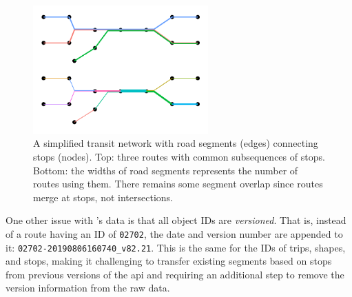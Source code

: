 \begin{knitrout}\small
{}\color{fgcolor}\begin{figure}

{\centering \includegraphics[width=0.6\textwidth]{figure/gtfs_route_network-1} 

}

\caption[A simplified transit network with road segments (edges) connecting stops (nodes)]{A simplified transit network with road segments (edges) connecting stops (nodes). Top: three routes with common subsequences of stops. Bottom: the widths of road segments represents the number of routes using them. There remains some segment overlap since routes merge at stops, not intersections.}\label{fig:gtfs_route_network}
\end{figure}


\end{knitrout}





One other issue with \AT{}'s \GTFS{} data is that all object IDs are \emph{versioned}. That is, instead of a route having an ID of \verb+02702+, the date and version number are appended to it: \verb+02702-20190806160740_v82.21+. This is the same for the IDs of trips, shapes, and stops, making it challenging to transfer existing segments based on stops from previous versions of the \gls{api} and requiring an additional step to remove the version information from the raw data.


